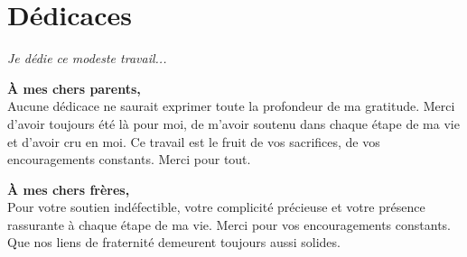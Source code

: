 \chapter*{Dédicaces}

\begin{flushright}
    \textit{Je dédie ce modeste travail...}
\end{flushright}

\vspace{1cm}

\noindent \textbf{À mes chers parents,}\\
Aucune dédicace ne saurait exprimer toute la profondeur de ma gratitude. Merci d'avoir toujours été là pour moi, de m'avoir soutenu dans chaque étape de ma vie et d'avoir cru en moi. Ce travail est le fruit de vos sacrifices, de vos encouragements constants. Merci pour tout.
\vspace{1cm}


\noindent \textbf{À mes chers frères,}\\
Pour votre soutien indéfectible, votre complicité précieuse et votre présence rassurante à chaque étape de ma vie. Merci pour vos encouragements constants. Que nos liens de fraternité demeurent toujours aussi solides.


